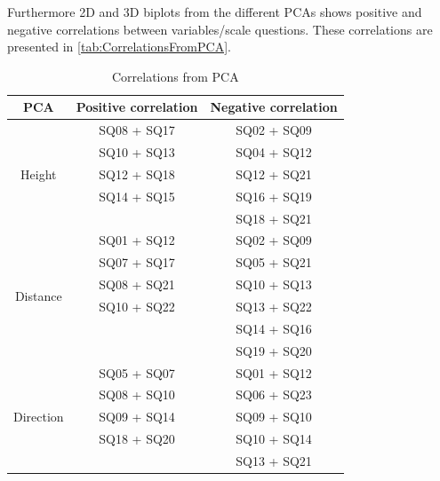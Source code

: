 Furthermore 2D and 3D biplots from the different PCAs shows positive and negative correlations between variables/scale questions. These correlations are presented in \autoref{tab:CorrelationsFromPCA}.
%
\begin{table}
	\centering
	\caption{Correlations from PCA}
	\label{tab:CorrelationsFromPCA} 
	\begin{tabular}{ c|c|c }
		\centering
		PCA & Positive correlation & Negative correlation \\ \hline
		\multirow{5}{*}{Height} & SQ08  + SQ17 & SQ02  + SQ09 \\
		& SQ10 + SQ13 & SQ04 + SQ12 \\
		& SQ12 + SQ18 & SQ12 + SQ21 \\
		& SQ14 + SQ15 & SQ16 + SQ19 \\
		&  & SQ18 + SQ21\\ \hline
		\multirow{6}{*}{Distance} & SQ01 + SQ12 & SQ02 + SQ09 \\
		& SQ07 + SQ17 & SQ05 + SQ21 \\
		& SQ08 + SQ21 & SQ10 + SQ13 \\
		& SQ10 + SQ22 & SQ13 + SQ22 \\
		&  & SQ14 + SQ16 \\	
		&  & SQ19 + SQ20 \\ \hline	
		\multirow{5}{*}{Direction} 
		& SQ05 + SQ07 & SQ01 + SQ12 \\
		& SQ08 + SQ10 & SQ06 + SQ23 \\
		& SQ09 + SQ14 & SQ09 + SQ10 \\
		& SQ18 + SQ20 & SQ10 + SQ14 \\
		&  & SQ13 + SQ21
	
	\end{tabular}        
\end{table}
\noindent
%

